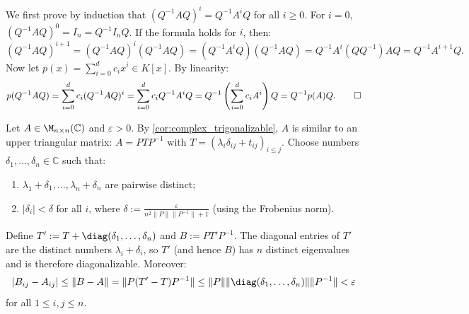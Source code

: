\begin{exercisesolution}
\label{sol:similarity_of_matrix_polynomials}
We first prove by induction that $(Q^{-1} A Q)^i = Q^{-1} A^i Q$ for all $i \ge 0$.
For $i = 0$, $(Q^{-1} A Q)^0 = I_n = Q^{-1} I_n Q$. If the formula holds for $i$, then:
\[
(Q^{-1} A Q)^{i+1} = (Q^{-1} A Q)^i (Q^{-1} A Q) = (Q^{-1} A^i Q)(Q^{-1} A Q) = Q^{-1} A^i (Q Q^{-1}) A Q = Q^{-1} A^{i+1} Q.
\]
Now let $p(x) = \sum_{i=0}^d c_i x^i \in K[x]$. By linearity:
\[
p(Q^{-1} A Q) = \sum_{i=0}^d c_i (Q^{-1} A Q)^i = \sum_{i=0}^d c_i Q^{-1} A^i Q = Q^{-1} \left( \sum_{i=0}^d c_i A^i \right) Q = Q^{-1} p(A) Q. \qedhere
\]
\end{exercisesolution}

\begin{exercisesolution}
\label{sol:density_of_diagonalizable_matrices}
Let $A \in \M_{n \times n}(\mathbb{C})$ and $\varepsilon > 0$.
By \cref{cor:complex_trigonalizable}, $A$ is similar to an upper triangular matrix: $A = P T P^{-1}$ with $T = (\lambda_i \delta_{ij} + t_{ij})_{i \le j}$.
Choose numbers $\delta_1, \dots, \delta_n \in \mathbb{C}$ such that:
\begin{enumerate}[label=\textbf{(\roman*)}]
    \item $\lambda_1 + \delta_1, \dots, \lambda_n + \delta_n$ are pairwise distinct;
    \item $|\delta_i| < \delta$ for all $i$, where $\delta := \frac{\varepsilon}{n^2 \|P\| \|P^{-1}\| + 1}$ (using the Frobenius norm).
\end{enumerate}
Define $T' := T + \diag(\delta_1, \dots, \delta_n)$ and $B := P T' P^{-1}$.
The diagonal entries of $T'$ are the distinct numbers $\lambda_i + \delta_i$, so $T'$ (and hence $B$) has $n$ distinct eigenvalues and is therefore diagonalizable.
Moreover:
\[
|B_{ij} - A_{ij}| \le \|B - A\| = \|P (T' - T) P^{-1}\| \le \|P\| \|\diag(\delta_1, \dots, \delta_n)\| \|P^{-1}\| < \varepsilon
\]
for all $1 \le i, j \le n$.
\end{exercisesolution}

